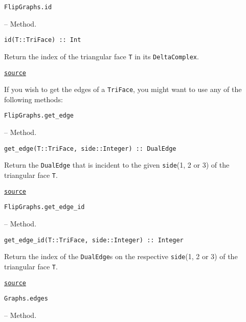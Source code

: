 \hypertarget{5123364288866187946}{\texttt{FlipGraphs.id}}  -- {Method.}

\begin{adjustwidth}{2em}{0pt}


\begin{verbatim}
id(T::TriFace) :: Int
\end{verbatim}

Return the index of the triangular face \texttt{T} in its \texttt{DeltaComplex}. 



\href{https://github.com/schto223/FlipGraphs.jl/blob/490c01a7adf74b42f27dda05099165c47ae8133e/src/deltaComplex.jl#L248-L252}{\texttt{source}}


\end{adjustwidth}

If you wish to get the edges of a \texttt{TriFace}, you might want to use any of the following methods:


\hypertarget{13542500775827372404}{\texttt{FlipGraphs.get\_edge}}  -- {Method.}

\begin{adjustwidth}{2em}{0pt}


\begin{verbatim}
get_edge(T::TriFace, side::Integer) :: DualEdge
\end{verbatim}

Return the \texttt{DualEdge} that is incident to the given \texttt{side}(1, 2 or 3) of the triangular face \texttt{T}.



\href{https://github.com/schto223/FlipGraphs.jl/blob/490c01a7adf74b42f27dda05099165c47ae8133e/src/deltaComplex.jl#L206-L210}{\texttt{source}}


\end{adjustwidth}
\hypertarget{1436822443817835679}{\texttt{FlipGraphs.get\_edge\_id}}  -- {Method.}

\begin{adjustwidth}{2em}{0pt}


\begin{verbatim}
get_edge_id(T::TriFace, side::Integer) :: Integer
\end{verbatim}

Return the index of the \texttt{DualEdge}s on the respective \texttt{side}(1, 2 or 3) of the triangular face \texttt{T}.



\href{https://github.com/schto223/FlipGraphs.jl/blob/490c01a7adf74b42f27dda05099165c47ae8133e/src/deltaComplex.jl#L213-L217}{\texttt{source}}


\end{adjustwidth}
\hypertarget{4963844152486253737}{\texttt{Graphs.edges}}  -- {Method.}

